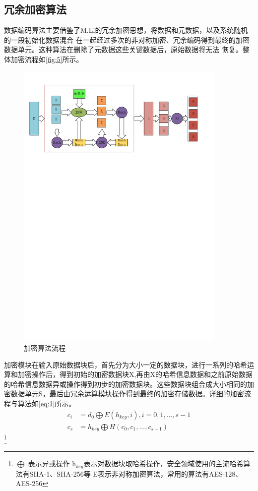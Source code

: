 \subsection{冗余加密算法}
数据编码算法主要借鉴了M.Li\cite{Li2014Convergent}的冗余加密思想，将数据和元数据，以及系统随机的一段初始化数据混合
在一起经过多次的非对称加密、冗余编码得到最终的加密数据单元。这种算法在删除了元数据这些关键数据后，原始数据将无法
恢复。整体加密流程如\autoref{fig:5}所示。
\begin{figure}[H]
	\centering
	\includegraphics[width=4in]{Pics/encrypt.pdf}
	\caption{加密算法流程}\label{fig:5}
\end{figure}
加密模块在输入原始数据块后，首先分为大小一定的数据块，进行一系列的哈希运算和加密操作后，得到初始的加密数据块X,再由X的哈希信息数据和之前原始数据的哈希信息数据异或操作得到初步的加密数据块。这些数据块组合成大小相同的加密数据单元S，最后由冗余运算模块操作得到最终的加密存储数据。详细的加密流程与算法如\autoref{eq:1}所示。
\begin{equation}
    \label{eq:1}
    \begin{aligned}
        c_{i} &=d_{0} \bigoplus E(h_{key},i),i=0,1,...,s-1 \\ %
        c_{s} &=h_{key} \bigoplus H(c_0,c_1,...,c_{s-1})     
    \end{aligned}
\end{equation}
\footnote{$\bigoplus$ 表示异或操作
\newline h$_{key}$表示对数据块取哈希操作，安全领域使用的主流哈希算法有SHA-1、SHA-256等
\newline E表示非对称加密算法，常用的算法有AES-128、AES-256
}

